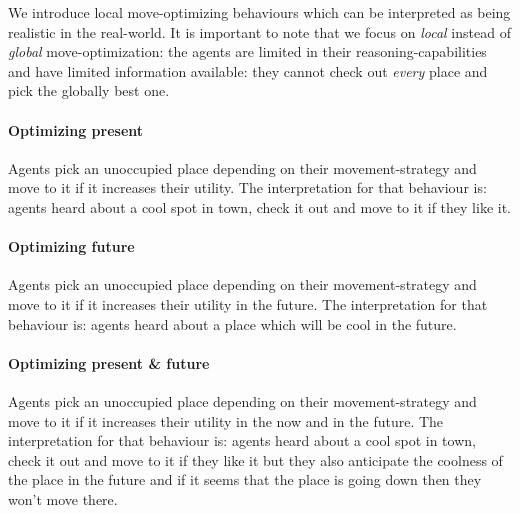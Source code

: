 We introduce local move-optimizing behaviours which can be interpreted as being realistic in the real-world. It is important to note that we focus on \textit{local} instead of \textit{global} move-optimization: the agents are limited in their reasoning-capabilities and have limited information available: they cannot check out \textit{every} place and pick the globally best one.

\paragraph{Optimizing present} Agents pick an unoccupied place depending on their movement-strategy and move to it if it increases their utility. The interpretation for that behaviour is: agents heard about a cool spot in town, check it out and move to it if they like it.

\paragraph{Optimizing future} Agents pick an unoccupied place depending on their movement-strategy and move to it if it increases their utility in the future. The interpretation for that behaviour is: agents heard about a place which will be cool in the future.

\paragraph{Optimizing present \& future} Agents pick an unoccupied place depending on their movement-strategy and move to it if it increases their utility in the now and in the future. The interpretation for that behaviour is: agents heard about a cool spot in town, check it out and move to it if they like it but they also anticipate the coolness of the place in the future and if it seems that the place is going down then they won't move there.